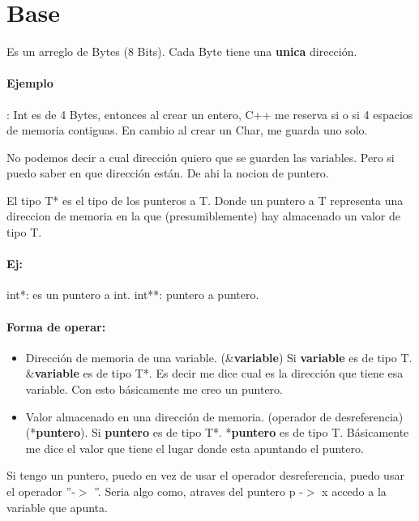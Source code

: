 \documentclass[11pt]{article}
\begin{document}
\section{Base}

Es un arreglo de Bytes (8 Bits).
Cada Byte tiene una \textbf{unica} dirección.

\paragraph{Ejemplo}: Int es de 4 Bytes, entonces al crear un entero, C++
me reserva si o si 4 espacios de memoria contiguas.
En cambio al crear un Char, me guarda uno solo.
\vspace{.5cm}

No podemos decir a cual dirección quiero que se guarden las variables.
Pero si puedo saber en que dirección están.
De ahi la nocion de puntero.

El tipo T* es el tipo de los punteros a T.
Donde un puntero a T representa una direccion de memoria en la que
(presumiblemente) hay almacenado un valor de tipo T.

\paragraph{Ej:} int*: es un puntero a int.
int**: puntero a puntero.
\vspace{.5cm}

\paragraph{Forma de operar:}
\begin{itemize}
    \item Dirección de memoria de una variable. (\&\textbf{variable})
Si \textbf{variable} es de tipo T.
\&\textbf{variable} es de tipo T*.
Es decir me dice cual es la dirección que tiene esa variable.
Con esto básicamente me creo un puntero.
    \item Valor almacenado en una dirección de memoria. (operador de desreferencia)
        (*\textbf{puntero}).
Si \textbf{puntero} es de tipo T*.
*\textbf{puntero} es de tipo T.
Básicamente me dice el valor que tiene el lugar donde esta apuntando el puntero.
\end{itemize}

Si tengo un puntero, puedo en vez de usar el operador desreferencia, puedo usar
el operador  ''-$>$ ''.
Seria algo como, atraves del puntero p -$>$ x accedo a la variable que apunta.
\end{document}
